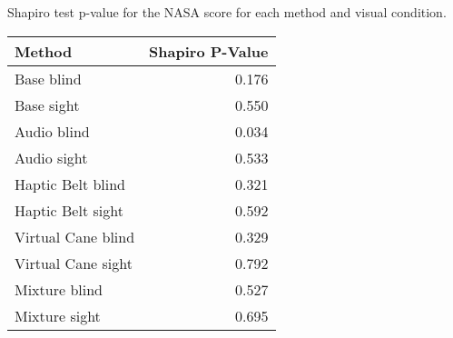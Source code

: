 
\centering
\caption{Shapiro test p-value for the NASA score for each method and visual condition.}
\label{tab:shapiro_nasa_score}
\begin{tabular}{lr}
\toprule
            Method &  Shapiro P-Value \\
\midrule
        Base blind &            0.176 \\
        Base sight &            0.550 \\
       Audio blind &            0.034 \\
       Audio sight &            0.533 \\
 Haptic Belt blind &            0.321 \\
 Haptic Belt sight &            0.592 \\
Virtual Cane blind &            0.329 \\
Virtual Cane sight &            0.792 \\
     Mixture blind &            0.527 \\
     Mixture sight &            0.695 \\
\bottomrule
\end{tabular}

